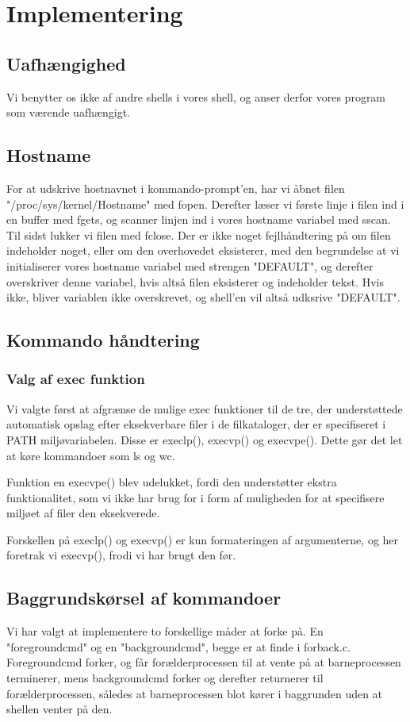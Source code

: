 \section{Implementering}
\subsection{Uafhængighed}


Vi benytter os ikke af andre shells i vores shell, og anser derfor vores program som værende uafhængigt. 

\subsection{Hostname}
For at udskrive hostnavnet i kommando-prompt'en, har vi åbnet filen "/proc/sys/kernel/Hostname" med fopen. Derefter læser vi første linje i filen ind i en buffer med fgets, og scanner linjen ind i vores hostname variabel med sscan. Til sidst lukker vi filen med fclose. Der er ikke noget fejlhåndtering på om filen indeholder noget, eller om den overhovedet eksisterer, med den begrundelse at vi initialiserer vores hostname variabel med strengen "DEFAULT", og derefter overskriver denne variabel, hvis altså filen eksisterer og indeholder tekst. Hvis ikke, bliver variablen ikke overskrevet, og shell'en vil altså udksrive "DEFAULT".

\subsection{Kommando håndtering}

\subsubsection{Valg af exec funktion}
Vi valgte først at afgrænse de mulige exec funktioner til de tre, der understøttede automatisk opslag efter eksekverbare filer i de filkataloger, der er specifiseret i PATH miljøvariabelen. Disse er execlp(), execvp() og execvpe(). Dette gør det let at køre kommandoer som ls og wc.

Funktion en execvpe() blev udelukket, fordi den understøtter ekstra funktionalitet, som vi ikke har brug for i form af muligheden for at specifisere miljøet af filer den eksekverede.

Forskellen på execlp() og execvp() er kun formateringen af argumenterne, og her foretrak vi execvp(), frodi vi har brugt den før.

\subsection{Baggrundskørsel af kommandoer}
Vi har valgt at implementere to forskellige måder at forke på. En "foregroundcmd" og en "backgroundcmd", begge er at finde i forback.c. Foregroundcmd forker, og får forælderprocessen til at vente på at barneprocessen terminerer, mens backgroundcmd forker og derefter returnerer til forælderprocessen, således at barneprocessen blot kører i baggrunden uden at shellen venter på den.

